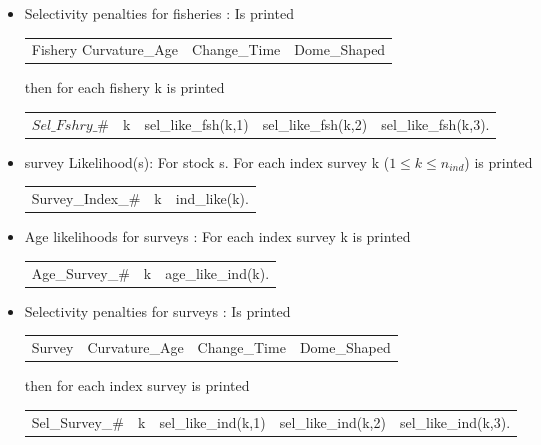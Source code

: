 \documentclass{article}
\begin{document}
\begin{itemize}
\begin{center}
\begin{tabular}{c c c}
        \end{tabular}
    \end{center}
    \item Selectivity penalties for fisheries : Is printed 
    \begin{center}
        \begin{tabular}{c c c}
           Fishery Curvature\_Age  & Change\_Time & Dome\_Shaped\\
        \end{tabular}
    \end{center}
    then for each fishery k is printed
    \begin{center}
        \begin{tabular}{c c c c c}
          $Sel\_Fshry\_\#$   &  k & sel\_like\_fsh(k,1) & sel\_like\_fsh(k,2) & sel\_like\_fsh(k,3). \\
        \end{tabular}
    \end{center}
    \item survey Likelihood(s): For stock s. For each index survey k ($1\leq k \leq n_{ind}$) is printed
    \begin{center}
        \begin{tabular}{c c c}
            Survey\_Index\_\# & k & ind\_like(k).\\
        \end{tabular}
    \end{center}
    \item Age likelihoods for surveys : For each index survey k is printed
    \begin{center}
        \begin{tabular}{c c c}
          Age\_Survey\_\#   & k & age\_like\_ind(k). \\
        \end{tabular}
    \end{center}
    \item Selectivity penalties for surveys : Is printed
    \begin{center}
        \begin{tabular}{c c c c}
          Survey   &  Curvature\_Age & Change\_Time  & Dome\_Shaped\\
        \end{tabular}
    \end{center}
    then for each index survey is printed
    \begin{center}
        \begin{tabular}{c c c c c}
           Sel\_Survey\_\#  &  k & sel\_like\_ind(k,1) & sel\_like\_ind(k,2) & sel\_like\_ind(k,3).\\

\end{tabular}
\end{center}
\end{itemize}
\end{document}
